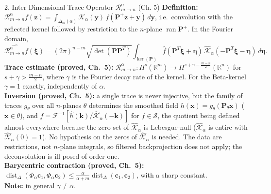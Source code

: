 \documentclass[11pt,a4paper,oneside]{article}
\begin{document}
\begin{conceptbox}{{2. Inter-Dimensional Trace Operator $\mathcal{R}_{m \to n}^\alpha$ (Ch. 5)}}
\textbf{Definition:} $\mathcal{R}_{m \to n}^\alpha f(\mathbf{z}) = \int_{\Delta_m(\alpha)} \mathcal{K}_\alpha(\mathbf{y})\, f(\mathbf{P}^+\mathbf{z} + \mathbf{y})\, d\mathbf{y}$, i.e.\ convolution with the reflected kernel followed by restriction to the $n$-plane $\operatorname{ran}\mathbf{P}^+$. In the Fourier domain,
$$\widehat{\mathcal{R}_{m \to n}^\alpha f}(\boldsymbol{\xi}) = (2\pi)^{n-m}\sqrt{\det(\mathbf{P}\mathbf{P}^T)} \int_{\operatorname{ker}(\mathbf{P})} \widehat{f}(\mathbf{P}^T \boldsymbol{\xi} + \boldsymbol{\eta})\, \widehat{\mathcal{K}}_\alpha(-\mathbf{P}^T \boldsymbol{\xi} - \boldsymbol{\eta})\, d\boldsymbol{\eta}.$$
\textbf{Trace estimate (proved, Ch.~5):} $\mathcal{R}_{m\to n}^\alpha : H^s(\mathbb{R}^m) \to H^{s+\gamma-\frac{m-n}{2}}(\mathbb{R}^n)$ for $s + \gamma > \frac{m-n}{2}$, where $\gamma$ is the Fourier decay rate of the kernel. For the Beta-kernel $\gamma = 1$ exactly, independently of $\alpha$.\\
\textbf{Inversion (proved, Ch.~5):} a single trace is never injective, but the family of traces $g_\theta$ over all $n$-planes $\theta$ determines the smoothed field $h(\mathbf{x}) = g_\theta(\mathbf{P}_\theta\mathbf{x})$ ($\mathbf{x} \in \theta$), and $f = \mathcal{F}^{-1}[\widehat{h}(\mathbf{k})/\widehat{\mathcal{K}}_\alpha(-\mathbf{k})]$ for $f \in \mathcal{S}$, the quotient being defined almost everywhere because the zero set of $\widehat{\mathcal{K}}_\alpha$ is Lebesgue-null ($\widehat{\mathcal{K}}_\alpha$ is entire with $\widehat{\mathcal{K}}_\alpha(0) = 1$). No hypothesis on the zeros of $\widehat{\mathcal{K}}_\alpha$ is needed. The data are restrictions, not $n$-plane integrals, so filtered backprojection does not apply; the deconvolution is ill-posed of order one.\\
\textbf{Barycentric contraction (proved, Ch.~5):} $\operatorname{dist}_\Delta(\Phi_\alpha\mathbf{c}_1, \Phi_\alpha\mathbf{c}_2) \le \frac{\alpha}{\alpha+m}\operatorname{dist}_\Delta(\mathbf{c}_1,\mathbf{c}_2)$, with a sharp constant.\\
\textbf{Note:} in general $\gamma \ne \alpha$.
\end{conceptbox}
\end{document}
